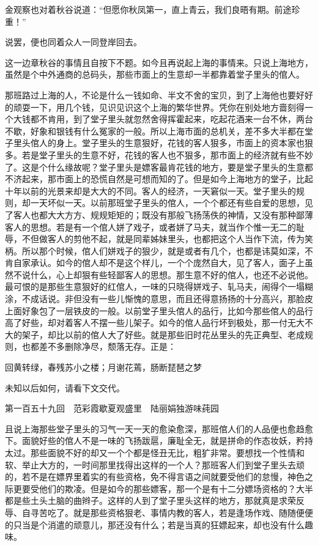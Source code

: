 \documentclass[12pt,UTF8]{ctexbook}
\begin{document}
{{{金观察也对着秋谷说道：“但愿你秋凤第一，直上青云，我们良晤有期。前途珍重！”

说罢，便也同着众人一同登岸回去。

这一边章秋谷的事情且自按下不题。如今且再说起上海的事情来。只说上海地方，虽然是个中外通商的总码头，那些市面上的生意却一半都靠着堂子里头的倌人。

那班路过上海的人，不论是什么一钱如命、半文不舍的宝贝，到了上海他也要好好的顽耍一下，用几个钱，见识见识这个上海的繁华世界。凭你在别处地方啬刻得一个大钱都不肯用，到了堂子里头就忽然舍得挥霍起来，吃起花酒来一台不休，两台不歇，好象和银钱有什么冤家的一般。所以上海市面的总机关，差不多大半都在堂子里头倌人的身上。堂子里头的生意狠好，花钱的客人狠多，市面上的资本家也狠多。若是堂子里头的生意不好，花钱的客人也不狠多，那市面上的经济就有些不妙了。这是个什么缘故呢？堂子里头是嫖客最肯花钱的地方，要是堂子里头的生意都不济起来，那市面上的恐慌自然是可想而知的了。但是如今上海地方的堂子，比起十年以前的光景来却是大大的不同。客人的经济，一天窘似一天。堂子里头的规则，却一天坏似一天。以前那班堂子里头的倌人，一个个都还有些自爱的思想，见了客人也都大大方方、规规矩矩的；既没有那般飞扬荡佚的神情，又没有那种鄙薄客人的思想。若是有一个倌人姘了戏子，或者姘了马夫，就当作个惟一无二的耻辱，不但做客人的剪他不起，就是同辈姊妹里头，也都把这个人当作下流，传为笑柄。所以那个时候，倌人们姘戏子的狠少，就是或者有几个，也都是讳莫如深，不肯自家承认。如今的倌人却不是这个样儿，一个个庞然自大，见了客人，面子上虽然不说什么，心上却狠有些轻鄙客人的思想。那生意不好的倌人，也还不必说他。最可恨的是那些生意狠好的红倌人，一味的只晓得姘戏子、轧马夫，闹得个一塌糊涂，不成话说。非但没有一些儿惭愧的意思，而且还得意扬扬的十分高兴，那脸皮上面好象包了一层铁皮的一般。以前堂子里头倌人的品行，比如今那些倌人的品行高了好些，却对着客人不摆一些儿架子。如今的倌人品行坏到极处，那一付无大不大的架子，却比以前的倌人大了好些。就是那些旧时花丛里头的先正典型、老成规则，也都差不多删除净尽，颓落无存。正是：

回黄转绿，春残苏小之楼；月谢花蔫，肠断琵琶之梦

未知以后如何，请看下文交代。





第一百五十九回　范彩霞歇夏观盛里　陆丽娟独游味莼园





且说上海那些堂子里头的习气一天一天的愈染愈深，那班倌人们的人品便也愈趋愈下。面貌好些的倌人不是一味的飞扬跋扈，廉耻全无，就是拼命的作态妆妖，矜持太过。那些面貌不好的却又一个个都是怪丑无比，粗犷非常。要想找一个性情和软、举止大方的，一时间那里找得出这样的一个人？那班客人们到堂子里头去顽的，若不是在嫖界里着实的有些资格，免不得言语之间就要受他们的怠慢，神色之际更要受他们的欺凌。但是如今的那些嫖客，那一个是有十二分嫖场资格的？大半都是些土头土脑的曲辫子。这样的人到了堂子里头这样的地方，那就真是求荣反辱、自寻苦吃了。就是那些资格狠老、事情内教的客人，若是逢场作戏、随随便便的只当是个消遣的顽意儿，那还没有什么；若是当真的狂嫖起来，却也没有什么趣味。

}}}
\end{document}

